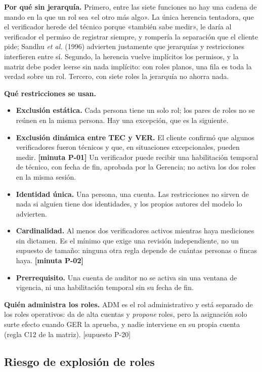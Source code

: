 \documentclass[11pt,letterpaper]{article}
\newcommand{\resp}[1]{\textrm{\footnotesize\bfseries [minuta #1]}}
\newcommand{\supu}[1]{\textrm{\footnotesize [supuesto #1]}}
\begin{document}
\textbf{Por qué sin jerarquía.} Primero, entre las siete funciones no hay una cadena de mando en la que
un rol sea «el otro más algo». La única herencia tentadora, que el verificador herede del técnico
porque «también sabe medir», le daría al verificador el permiso de registrar siempre, y rompería la
separación que el cliente pide; Sandhu \emph{et al.} (1996) advierten justamente que jerarquías y
restricciones interfieren entre sí. Segundo, la herencia vuelve implícitos los permisos, y la matriz
debe poder leerse sin nada implícito: con roles planos, una fila es toda la verdad sobre un rol.
Tercero, con siete roles la jerarquía no ahorra nada.

\textbf{Qué restricciones se usan.}

\begin{itemize}
\item \textbf{Exclusión estática.} Cada persona tiene un solo rol; los pares de roles no se reúnen en la
      misma persona. Hay una excepción, que es la siguiente.
\item \textbf{Exclusión dinámica entre TEC y VER.} El cliente confirmó que algunos verificadores fueron
      técnicos y que, en situaciones excepcionales, pueden medir. \resp{P-01} Un verificador puede
      recibir una habilitación temporal de técnico, con fecha de fin, aprobada por la Gerencia; no
      activa los dos roles en la misma sesión.
\item \textbf{Identidad única.} Una persona, una cuenta. Las restricciones no sirven de nada si alguien
      tiene dos identidades, y los propios autores del modelo lo advierten.
\item \textbf{Cardinalidad.} Al menos dos verificadores activos mientras haya mediciones sin dictamen.
      Es el mínimo que exige una revisión independiente, no un supuesto de tamaño: ninguna otra regla
      depende de cuántas personas o fincas haya. \resp{P-02}
\item \textbf{Prerrequisito.} Una cuenta de auditor no se activa sin una ventana de vigencia, ni una
      habilitación temporal sin su fecha de fin.
\end{itemize}

\textbf{Quién administra los roles.} ADM es el rol administrativo y está separado de los roles operativos:
da de alta cuentas y \emph{propone} roles, pero la asignación solo surte efecto cuando GER la aprueba, y
nadie interviene en su propia cuenta (regla C12 de la matriz). \supu{P-20}

\subsection{Riesgo de explosión de roles}
\end{document}
